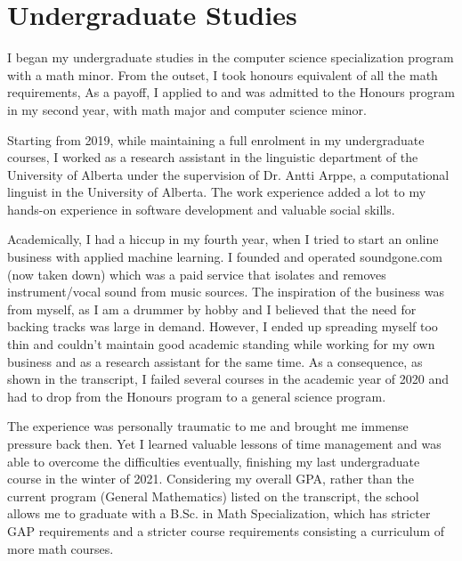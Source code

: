 \section*{Undergraduate Studies}

I began my undergraduate studies in the computer science specialization program with a math minor.
From the outset, I took honours equivalent of all the math requirements,
As a payoff, I applied to and was admitted to the Honours program in my second year,
with math major and computer science minor.

Starting from 2019, while maintaining a full enrolment in my undergraduate courses,
I worked as a research assistant in the linguistic department of the University of Alberta
under the supervision of Dr. Antti Arppe, a computational linguist in the University of Alberta.
The work experience added a lot to my hands-on experience in software development and valuable social skills.

Academically, I had a hiccup in my fourth year,
when I tried to start an online business with applied machine learning.
I founded and operated soundgone.com (now taken down) which was a paid service that isolates and removes instrument/vocal sound
from music sources.
The inspiration of the business was from myself, as I am a drummer by hobby and I believed that
the need for backing tracks was large in demand.
However, I ended up spreading myself too thin and couldn't maintain good academic standing
while working for my own business and as a research assistant for the same time.
As a consequence, as shown in the transcript,
I failed several courses in the academic year of 2020 and had to drop from the Honours program to a general science program.

The experience was personally traumatic to me and brought me immense pressure back then.
Yet I learned valuable lessons of time management and was able to overcome the difficulties eventually,
finishing my last undergraduate course in the winter of 2021.
Considering my overall GPA,
rather than the current program (General Mathematics) listed on the transcript,
the school allows me to graduate with a B.Sc. in Math Specialization,
which has stricter GAP requirements and a stricter course requirements consisting a curriculum of more math courses.
